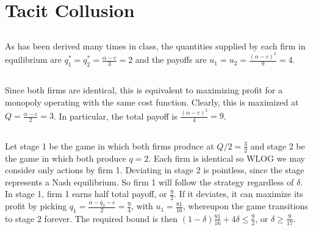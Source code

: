 \documentclass{article}
\begin{document}
\section{Tacit Collusion}
\subsection{}
As has been derived many times in class, the quantities supplied by each firm in equilibrium are $q_1^* = q_2^* = \frac{\alpha - c}{3} = 2$ and the payoffs are $u_1 = u_2 = \frac{(\alpha - c)^2}{9} = 4$.
\subsection{}
Since both firms are identical, this is equivalent to maximizing profit for a monopoly operating with the same cost function. Clearly, this is maximized at $Q = \frac{\alpha - c}{2} = 3$. In particular, the total payoff is $\frac{(\alpha - c)^2}{4} = 9$.
\subsection{}
Let stage 1 be the game in which both firms produce at $Q/2 = \frac{3}{2}$ and stage 2 be the game in which both produce $q = 2$. Each firm is identical so WLOG we may consider only actions by firm 1. Deviating in stage 2 is pointless, since the stage represents a Nash equilibrium. So firm 1 will follow the strategy regardless of $\delta$. In stage 1, firm 1 earns half total payoff, or $\frac{9}{2}$. If it deviates, it can maximize its profit by picking $q_1 = \frac{\alpha - q_2 - c}{2} = \frac{9}{4}$, with $u_1 = \frac{81}{16}$, whereupon the game transitions to stage 2 forever. The required bound is then $(1-\delta)\frac{81}{16} + 4\delta \leq \frac{9}{2}$, or $\delta \geq \frac{9}{17}$.
\end{document}
